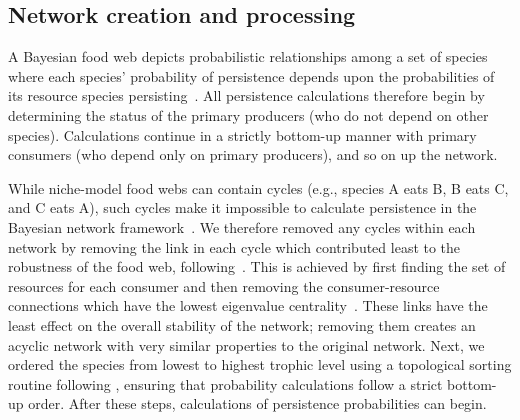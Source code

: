 \documentclass[12pt]{article}
\begin{document}
\begin{spacing}{2.0}

    

\section{Network creation and processing}

    A Bayesian food web depicts probabilistic relationships among a set of species where each species' probability of persistence depends upon the probabilities of its resource species persisting~\citep{Jensen_Nielsen,Eklof2013}. 
    All persistence calculations therefore begin  by determining the status of the primary producers (who do not depend on other species).
    Calculations continue in a strictly bottom-up manner with primary consumers (who depend only on primary producers), and so on up the network.

        
    While niche-model food webs can contain cycles (e.g., species A eats B, B eats C, and C eats A), such cycles make it impossible to calculate persistence in the Bayesian network framework~\citep{Tarjan1972}. 
    We therefore removed any cycles within each network by removing the link in each cycle which contributed least to the robustness of the food web, following~\citet{Allesina2009}.
    This is achieved by first finding the set of resources for each consumer and then removing the consumer-resource connections which have the lowest eigenvalue centrality~\citep{Allesina2009}.
    These links have the least effect on the overall stability of the network; removing them creates an acyclic network with very similar properties to the original network.
    Next, we ordered the species from lowest to highest trophic level using a topological sorting routine following \citep{Tarjan1972, Allesinaetal2005}, ensuring that probability calculations follow a strict bottom-up order. 
    After these steps, calculations of persistence probabilities can begin.
        


\end{spacing}
\end{document}
